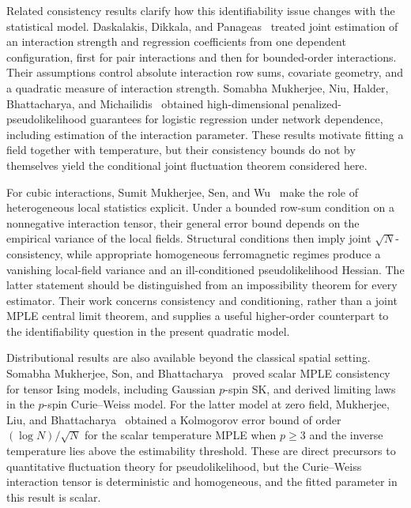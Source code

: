\documentclass[11pt]{amsart}
\numberwithin{equation}{section}
\theoremstyle{remark}
\begin{document}
Related consistency results clarify how this identifiability issue changes with the statistical model. Daskalakis, Dikkala, and Panageas~\cite{DaskalakisDikkalaPanageas2019,DaskalakisDikkalaPanageas2020} treated joint estimation of an interaction strength and regression coefficients from one dependent configuration, first for pair interactions and then for bounded-order interactions. Their assumptions control absolute interaction row sums, covariate geometry, and a quadratic measure of interaction strength. Somabha Mukherjee, Niu, Halder, Bhattacharya, and Michailidis~\cite{MukherjeeEtAl2024} obtained high-dimensional penalized-pseudolikelihood guarantees for logistic regression under network dependence, including estimation of the interaction parameter. These results motivate fitting a field together with temperature, but their consistency bounds do not by themselves yield the conditional joint fluctuation theorem considered here.

For cubic interactions, Sumit Mukherjee, Sen, and Wu~\cite{MukherjeeSenWu2026} make the role of heterogeneous local statistics explicit. Under a bounded row-sum condition on a nonnegative interaction tensor, their general error bound depends on the empirical variance of the local fields. Structural conditions then imply joint $\sqrt N$-consistency, while appropriate homogeneous ferromagnetic regimes produce a vanishing local-field variance and an ill-conditioned pseudolikelihood Hessian. The latter statement should be distinguished from an impossibility theorem for every estimator. Their work concerns consistency and conditioning, rather than a joint MPLE central limit theorem, and supplies a useful higher-order counterpart to the identifiability question in the present quadratic model.

Distributional results are also available beyond the classical spatial setting. Somabha Mukherjee, Son, and Bhattacharya~\cite{MukherjeeSonBhattacharya2022} proved scalar MPLE consistency for tensor Ising models, including Gaussian $p$-spin SK, and derived limiting laws in the $p$-spin Curie--Weiss model. For the latter model at zero field, Mukherjee, Liu, and Bhattacharya~\cite[Theorem~4]{MukherjeeLiuBhattacharya2024} obtained a Kolmogorov error bound of order $(\log N)/\sqrt N$ for the scalar temperature MPLE when $p\ge3$ and the inverse temperature lies above the estimability threshold. These are direct precursors to quantitative fluctuation theory for pseudolikelihood, but the Curie--Weiss interaction tensor is deterministic and homogeneous, and the fitted parameter in this result is scalar.
\end{document}

